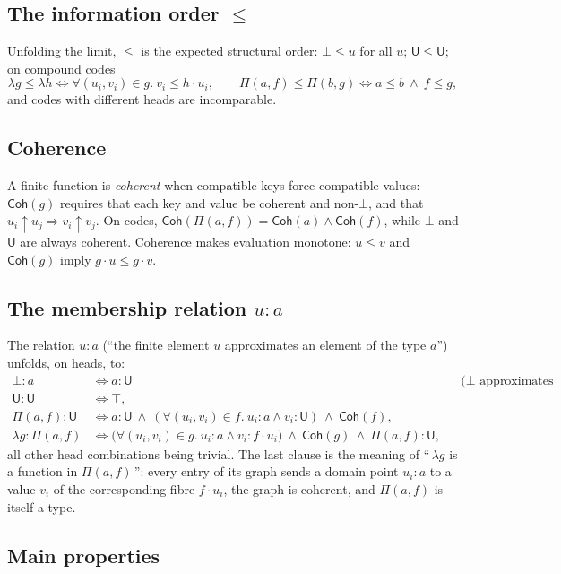 \documentclass[11pt]{article}
\newcommand{\U}{\mathsf{U}}
\newcommand{\Bot}{\bot}
\newcommand{\PiC}[2]{\Pi(#1,#2)}        %
\newcommand{\FunEl}[1]{\lambda #1}      %
\newcommand{\ev}[2]{#1\!\cdot\!#2}      %
\newcommand{\comp}{\mathbin{\uparrow}}  %
\newcommand{\Coh}{\mathsf{Coh}}
\theoremstyle{plain}
\theoremstyle{definition}
\begin{document}
\subsection{The information order $\leq$}

Unfolding the limit, $\leq$ is the expected structural order: $\Bot \leq u$ for
all $u$; $\U \leq \U$; on compound codes
\[
  \FunEl g \leq \FunEl h \iff
  \forall (u_i,v_i)\in g.\ v_i \leq \ev h {u_i},
  \qquad
  \PiC{a}{f} \leq \PiC{b}{g} \iff a\leq b \ \wedge\ f \leq g,
\]
and codes with different heads are incomparable.

\subsection{Coherence}

A finite function is \emph{coherent} when compatible keys force compatible
values: $\Coh(g)$ requires that each key and value be coherent and non-$\Bot$,
and that $u_i \comp u_j \Rightarrow v_i \comp v_j$.  On codes,
$\Coh(\PiC{a}{f}) = \Coh(a)\wedge\Coh(f)$, while $\Bot$ and $\U$ are always
coherent.  Coherence makes evaluation monotone:
$u \leq v$ and $\Coh(g)$ imply $\ev g u \leq \ev g v$.

\subsection{The membership relation $u : a$}

The relation $u : a$ (``the finite element $u$ approximates an element of the
type $a$'') unfolds, on heads, to:
\[
  \begin{aligned}
    \Bot : a &\iff a : \U
      &&\text{(}\Bot\text{ approximates every type),}\\
    \U : \U &\iff \top, \\
    \PiC{a}{f} : \U &\iff a : \U \ \wedge\ (\forall (u_i,v_i)\in f.\ u_i : a \wedge v_i : \U)\ \wedge\ \Coh(f),\\
    \FunEl g : \PiC{a}{f} &\iff \bigl(\forall (u_i,v_i)\in g.\ u_i : a \wedge v_i : \ev f {u_i}\bigr)
      \ \wedge\ \Coh(g)\ \wedge\ \PiC{a}{f} : \U,
  \end{aligned}
\]
all other head combinations being trivial.  The last clause is the meaning of
``\,$\FunEl g$ is a function in $\PiC{a}{f}$\,'': every entry of its graph sends
a domain point $u_i : a$ to a value $v_i$ of the corresponding fibre
$\ev f{u_i}$, the graph is coherent, and $\PiC{a}{f}$ is itself a type.

\subsection{Main properties}
\end{document}
